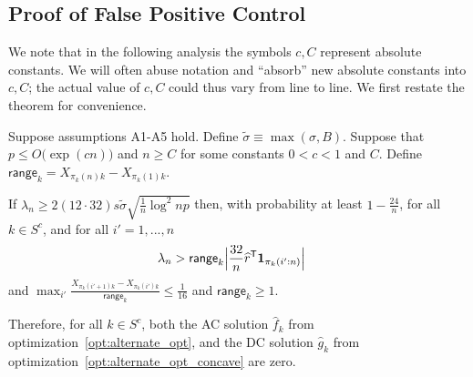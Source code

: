  
 
 \subsection{Proof of False Positive Control}
 \label{sec:false_positive_proof}
 
 We note that in the following analysis the symbols $c,C$ represent
 absolute constants. We will often abuse notation and ``absorb'' new
 absolute constants into $c, C$; the actual value of $c, C$ could thus
 vary from line to line.
We first restate the theorem for convenience. 

\begin{theorem} 
Suppose assumptions A1-A5 hold. Define $\tilde{\sigma} \equiv \max(\sigma, B)$. Suppose that $p \leq O\big( \exp( c n) \big)$ and $n \geq C$ for some constants $0<c<1$ and $C$. Define $\mathsf{range}_k = X_{\pi_k(n)k} - X_{\pi_k(1)k}$.

If $\lambda_n \geq 2 (12 \cdot 32) s \tilde{\sigma}  \sqrt{ \frac{1}{n} \log^2 np}$ then, with probability at least $ 1 - \frac{24}{n}$, for all $k \in S^c$, and for all $i'=1,...,n$
\begin{align*}
& \lambda_n > \mathsf{range}_k \Big| \frac{32}{n}\widehat{r}^{\mathsf{T}} \mbox{\boldmath $1$}_{\pi_k(i':n)} \Big|  
\end{align*}
and $\max_{i'} \frac{X_{\pi_k(i'+1)k} - X_{\pi_k(i')k}}{\mathsf{range}_k} \leq \frac{1}{16}$ and $\mathsf{range}_k \geq 1$.

Therefore, for all $k \in S^c$, both the AC solution $\hat{f}_k$ from optimization~\ref{opt:alternate_opt}, and the DC solution $\hat{g}_k$ from optimization~\ref{opt:alternate_opt_concave} are zero. 
\end{theorem}

